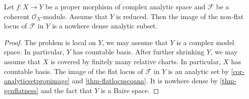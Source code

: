 \begin{corollary}
    Let $f:X\rightarrow Y$ be a proper morphism of complex analytic space and $\mathcal{F}$ be a coherent $\mathcal{O}_X$-module. Assume that $Y$ is reduced. Then the image of the non-flat locus of $\mathcal{F}$ in $Y$ is a nowhere dense analytic subset.
\end{corollary}
\begin{proof}
The problem is local on $Y$, we may assume that $Y$ is a complex model space. In particular, $Y$ has countable basis. After further shrinking $Y$, we may assume that $X$ is covered by finitely many relative charts. In particular, $X$ has countable basis. The image of the flat locus of $\mathcal{F}$ in $Y$ is an analytic set by \cref{cor-analyticsetpropimage} and \cref{thm-flatlocuscoana}. It is nowhere dense by \cref{thm-genflatness} and the fact that $Y$ is a Baire space. 
\end{proof}



\printbibliography
